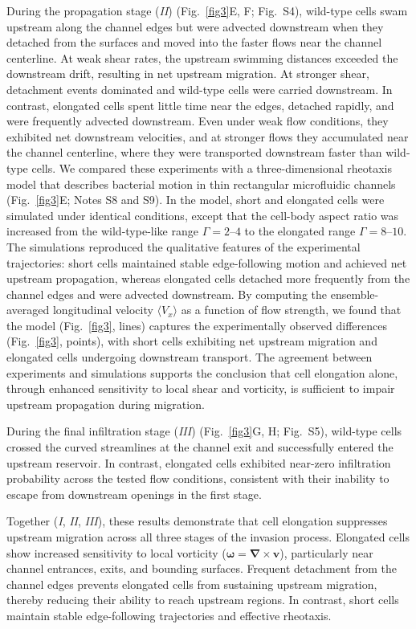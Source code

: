 \documentclass[twoside,twocolumn,9pt]{article}
\renewcommand{\vec}[1]{\bm{#1}}
\begin{document}
    During the propagation stage (\textit{II}) (Fig.~\ref{fig3}E, F; Fig.~S4), wild-type cells swam upstream along the channel edges but were advected downstream when they detached from the surfaces and moved into the faster flows near the channel centerline. At weak shear rates, the upstream swimming distances exceeded the downstream drift, resulting in net upstream migration. At stronger shear, detachment events dominated and wild-type cells were carried downstream. In contrast, elongated cells spent little time near the edges, detached rapidly, and were frequently advected downstream. Even under weak flow conditions, they exhibited net downstream velocities, and at stronger flows they accumulated near the channel centerline, where they were transported downstream faster than wild-type cells. We compared these experiments with a three-dimensional rheotaxis model that describes bacterial motion in thin rectangular microfluidic channels (Fig.~\ref{fig3}E; Notes S8 and S9). In the model, short and elongated cells were simulated under identical conditions, except that the cell-body aspect ratio was increased from the wild-type-like range \(\Gamma=2\text{--}4\) to the elongated range \(\Gamma=8\text{--}10\). The simulations reproduced the qualitative features of the experimental trajectories: short cells maintained stable edge-following motion and achieved net upstream propagation, whereas elongated cells detached more frequently from the channel edges and were advected downstream. By computing the ensemble-averaged longitudinal velocity \(\langle V_x\rangle\) as a function of flow strength, we found that the model (Fig.~\ref{fig3}, lines) captures the experimentally observed differences (Fig.~\ref{fig3}, points), with short cells exhibiting net upstream migration and elongated cells undergoing downstream transport. The agreement between experiments and simulations supports the conclusion that cell elongation alone, through enhanced sensitivity to local shear and vorticity, is sufficient to impair upstream propagation during migration.
    
    During the final infiltration stage (\textit{III}) (Fig.~\ref{fig3}G, H; Fig.~S5), wild-type cells crossed the curved streamlines at the channel exit and successfully entered the upstream reservoir. In contrast, elongated cells exhibited near-zero infiltration probability across the tested flow conditions, consistent with their inability to escape from downstream openings in the first stage.
    
    Together (\textit{I}, \textit{II}, \textit{III}), these results demonstrate that cell elongation suppresses upstream migration across all three stages of the invasion process. Elongated cells show increased sensitivity to local vorticity ($\vec{\omega} = \vec{\nabla}\times\vec{v}$), particularly near channel entrances, exits, and bounding surfaces. Frequent detachment from the channel edges prevents elongated cells from sustaining upstream migration, thereby reducing their ability to reach upstream regions. In contrast, short cells maintain stable edge-following trajectories and effective rheotaxis.
    
\end{document}
